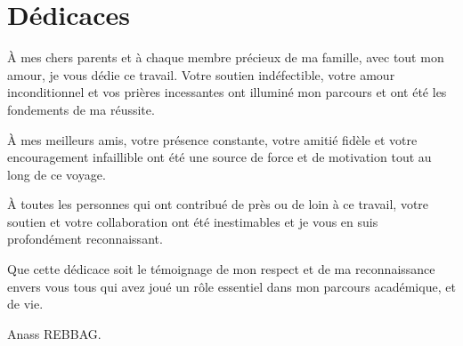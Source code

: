 \chapter*{Dédicaces}


\hspace{\parindent}À mes chers parents et à chaque membre précieux de ma famille, avec tout mon amour, je vous dédie ce travail. Votre soutien indéfectible, votre amour inconditionnel et vos prières incessantes ont illuminé mon parcours et ont été les fondements de ma réussite.

\vspace{1\baselineskip}
À mes meilleurs amis, votre présence constante, votre amitié fidèle et votre encouragement infaillible ont été une source de force et de motivation tout au long de ce voyage.

\vspace{1\baselineskip}
À toutes les personnes qui ont contribué de près ou de loin à ce travail, votre soutien et votre collaboration ont été inestimables et je vous en suis profondément reconnaissant.

\vspace{1\baselineskip}
Que cette dédicace soit le témoignage de mon respect et de ma reconnaissance envers vous tous qui avez joué un rôle essentiel dans mon parcours académique, et de vie.

\par   %


\vspace{\baselineskip}
Anass REBBAG.


